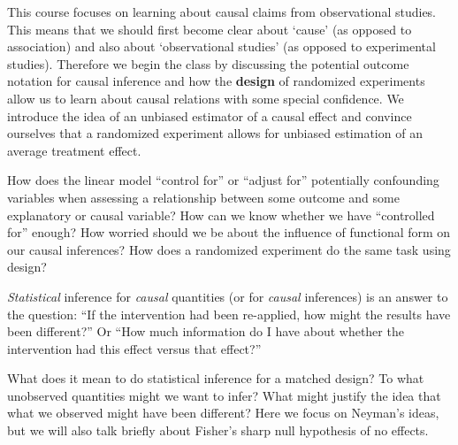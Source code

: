 
This course focuses on learning about causal claims from observational
studies. This means that we should first become clear about `cause' (as
opposed to association) and also about `observational studies' (as opposed to
experimental studies). Therefore we begin the class by discussing the
potential outcome notation for causal inference and how the \textbf{design} of
randomized experiments allow us to learn about causal relations with some
special confidence. We introduce the idea of an unbiased estimator of a causal
effect and convince ourselves that a randomized experiment allows for unbiased
estimation of an average treatment effect. 


How does the linear model ``control for'' or ``adjust for'' potentially
confounding variables when assessing a relationship between some outcome and
some explanatory or causal variable? How can we know whether we have
``controlled for'' enough? How worried should we be about the influence of
functional form on our causal inferences? How does a randomized experiment do the
same task using design? 




\emph{Statistical} inference for \emph{causal} quantities (or for
\emph{causal} inferences) is an answer to the question: ``If the intervention
had been re-applied, how might the results have been different?'' Or ``How
much information do I have about whether the intervention had this effect
versus that effect?''

What does it mean to do statistical inference for a matched design? To what
unobserved quantities might we want to infer? What might justify the idea that
what we observed might have been different? Here we focus on Neyman's ideas,
but we will also talk briefly about Fisher's sharp null hypothesis of no
effects.


